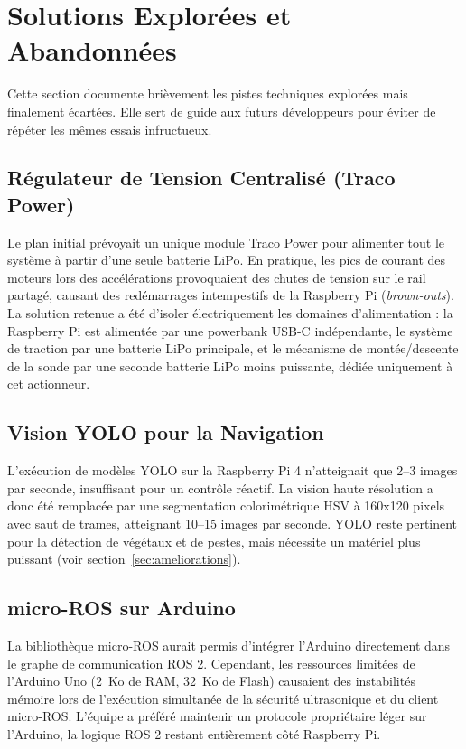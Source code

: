 \section{Solutions Explorées et Abandonnées}

Cette section documente brièvement les pistes techniques explorées mais finalement écartées. Elle sert de guide aux futurs développeurs pour éviter de répéter les mêmes essais infructueux.

\subsection{Régulateur de Tension Centralisé (Traco Power)}
Le plan initial prévoyait un unique module Traco Power pour alimenter tout le système à partir d'une seule batterie LiPo. En pratique, les pics de courant des moteurs lors des accélérations provoquaient des chutes de tension sur le rail partagé, causant des redémarrages intempestifs de la Raspberry Pi (\textit{brown-outs}). La solution retenue a été d'isoler électriquement les domaines d'alimentation : la Raspberry Pi est alimentée par une powerbank USB-C indépendante, le système de traction par une batterie LiPo principale, et le mécanisme de montée/descente de la sonde par une seconde batterie LiPo moins puissante, dédiée uniquement à cet actionneur.

\subsection{Vision YOLO pour la Navigation}
L'exécution de modèles YOLO sur la Raspberry Pi 4 n'atteignait que 2--3 images par seconde, insuffisant pour un contrôle réactif. La vision haute résolution a donc été remplacée par une segmentation colorimétrique HSV à 160x120 pixels avec saut de trames, atteignant 10--15 images par seconde. YOLO reste pertinent pour la détection de végétaux et de pestes, mais nécessite un matériel plus puissant (voir section~\ref{sec:ameliorations}).

\subsection{micro-ROS sur Arduino}
La bibliothèque micro-ROS aurait permis d'intégrer l'Arduino directement dans le graphe de communication ROS 2. Cependant, les ressources limitées de l'Arduino Uno (2~Ko de RAM, 32~Ko de Flash) causaient des instabilités mémoire lors de l'exécution simultanée de la sécurité ultrasonique et du client micro-ROS. L'équipe a préféré maintenir un protocole propriétaire léger sur l'Arduino, la logique ROS 2 restant entièrement côté Raspberry Pi.

